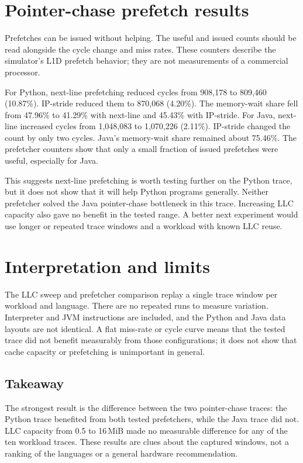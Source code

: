 \documentclass[11pt]{article}
\begin{document}
\section{Pointer-chase prefetch results}


Prefetches can be issued without helping. The useful and issued counts should
be read alongside the cycle change and miss rates. These counters describe the
simulator's L1D prefetch behavior; they are not measurements of a commercial
processor.

For Python, next-line prefetching reduced cycles from 908,178 to 809,460
(10.87\%). IP-stride reduced them to 870,068 (4.20\%). The memory-wait share
fell from 47.96\% to 41.29\% with next-line and 45.43\% with IP-stride.
For Java, next-line increased cycles from 1,048,083 to 1,070,226 (2.11\%).
IP-stride changed the count by only two cycles. Java's memory-wait share
remained about 75.46\%. The prefetcher counters show that only a small fraction
of issued prefetches were useful, especially for Java.

This suggests next-line prefetching is worth testing further on the Python
trace, but it does not show that it will help Python programs generally. Neither
prefetcher solved the Java pointer-chase bottleneck in this trace. Increasing
LLC capacity also gave no benefit in the tested range. A better next experiment
would use longer or repeated trace windows and a workload with known LLC reuse.

\section{Interpretation and limits}
The LLC sweep and prefetcher comparison replay a single trace window per
workload and language. There are no repeated runs to measure variation.
Interpreter and JVM instructions are included, and the Python and Java data
layouts are not identical. A flat miss-rate or cycle curve means that the
tested trace did not benefit measurably from those configurations; it does not
show that cache capacity or prefetching is unimportant in general.

\subsection{Takeaway}
The strongest result is the difference between the two pointer-chase traces:
the Python trace benefited from both tested prefetchers, while the Java trace
did not. LLC capacity from 0.5 to 16\,MiB made no measurable difference for any
of the ten workload traces. These results are clues about the captured windows,
not a ranking of the languages or a general hardware recommendation.
\end{document}
